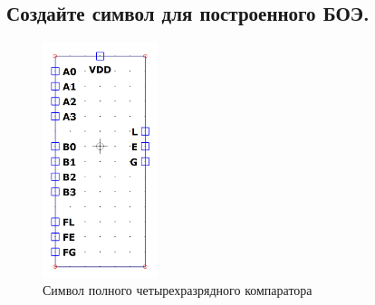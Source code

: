 \documentclass[12pt,onecolumn]{article}
\begin{document}
\subsection{Создайте символ для построенного БОЭ.}
\begin{figure}[H]
    \centering
    \includegraphics[width=0.3\textwidth]{image/full-comparator-sym.png}
    \caption{Символ полного четырехразрядного компаратора}
\end{figure}
\end{document}
